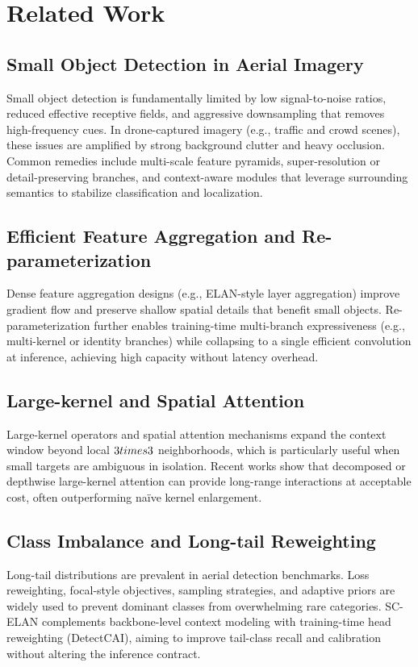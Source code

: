 \section{Related Work}

\subsection{Small Object Detection in Aerial Imagery}
Small object detection is fundamentally limited by low signal-to-noise ratios, reduced effective receptive fields, and aggressive downsampling that removes high-frequency cues.
In drone-captured imagery (e.g., traffic and crowd scenes), these issues are amplified by strong background clutter and heavy occlusion.
Common remedies include multi-scale feature pyramids, super-resolution or detail-preserving branches, and context-aware modules that leverage surrounding semantics to stabilize classification and localization.

\subsection{Efficient Feature Aggregation and Re-parameterization}
Dense feature aggregation designs (e.g., ELAN-style layer aggregation) improve gradient flow and preserve shallow spatial details that benefit small objects.
Re-parameterization further enables training-time multi-branch expressiveness (e.g., multi-kernel or identity branches) while collapsing to a single efficient convolution at inference, achieving high capacity without latency overhead.

\subsection{Large-kernel and Spatial Attention}
Large-kernel operators and spatial attention mechanisms expand the context window beyond local $3\\times3$ neighborhoods, which is particularly useful when small targets are ambiguous in isolation.
Recent works show that decomposed or depthwise large-kernel attention can provide long-range interactions at acceptable cost, often outperforming naïve kernel enlargement.

\subsection{Class Imbalance and Long-tail Reweighting}
Long-tail distributions are prevalent in aerial detection benchmarks.
Loss reweighting, focal-style objectives, sampling strategies, and adaptive priors are widely used to prevent dominant classes from overwhelming rare categories.
SC-ELAN complements backbone-level context modeling with training-time head reweighting (DetectCAI), aiming to improve tail-class recall and calibration without altering the inference contract.
